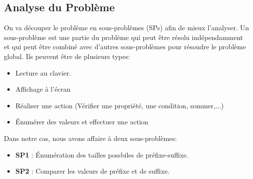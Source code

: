 \subsection{Analyse du Problème}

On va découper le problème en sous-problèmes (SPs) afin de mieux l'analyser.
Un sous-problème est une partie du problème qui peut être résolu indépendamment
et qui peut être combiné avec d'autres sous-problèmes pour résoudre le problème
global. Ils peuvent être de plusieurs types:
\begin{itemize}
   \item Lecture au clavier.
   \item Affichage à l'écran
   \item Réaliser une action (Vérifier une propriété, une condition, sommer,...)
   \item \'Enumérer des valeurs et effectuer une action
\end{itemize}
Dans notre cas, nous avons affaire à deux sous-problèmes:
\begin{itemize}
   \item \textbf{SP1} : \'Enumération des tailles possbiles de préfixe-suffixe.
   \item \textbf{SP2} : Comparer les valeurs de préfixe et de suffixe.
\end{itemize}